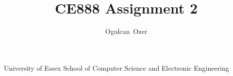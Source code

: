 \documentclass[journal]{IEEEtran}
\begin{document}
%
\title{CE888 Assignment 2}
%
%
%

\author{Ogulcan~Ozer}%


% 
%



%
{University of Essex School of Computer Science and Electronic Engineering}
% 
\end{document}
